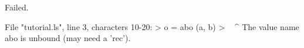 \runverbatimfalse
{}
\begin{RunVerbatimMsg}
Failed.
\end{RunVerbatimMsg}
\begin{RunVerbatimErr}
File "tutorial.ls", line 3, characters 10-20:
>      o = abo (a, b)
>          ^^^^^^^^^^
The value name abo is unbound (may need a 'rec').
\end{RunVerbatimErr}
